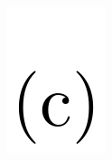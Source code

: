 \documentclass[
  a4paper,
]{scrbook}
\begin{document}
\begin{figure}
\begin{minipage}[t]{0.03\linewidth}
{{\includegraphics{figures/(c).png}

}

}

\end{minipage}%
%
\begin{minipage}[t]{0.01\linewidth}

{\centering 

~

}

\end{minipage}%
%
\begin{minipage}[t]{0.45\linewidth}

{\centering 


}

\end{minipage}%
%
\begin{minipage}[t]{0.01\linewidth}

{\centering 

~

}

\end{minipage}%
%
\begin{minipage}[t]{0.03\linewidth}

{\centering 

}
\end{minipage}
\end{figure}
\end{document}
